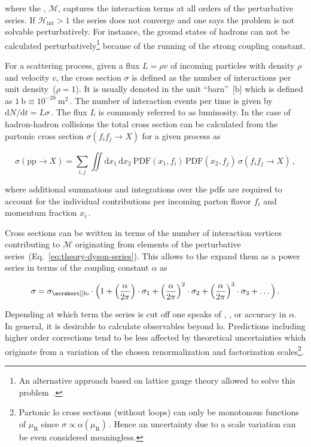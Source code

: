 where the , $\mathcal{M}$, captures the interaction terms at all orders of the perturbative series.  If $\mathcal{H}_\mathrm{int}>1$ the series does not converge and one says the problem is not solvable perturbatively. For instance, the ground states of hadrons can not be calculated perturbatively\footnote{An alternative approach based on lattice gauge theory allowed to solve this problem~\cite{Durr:2008zz}.} because of the running of the strong coupling constant.

For a scattering process, given a flux $L=\rho v$ of incoming particles with density $\rho$ and velocity $v$, the cross section $\sigma$ is defined as the number of interactions per unit density~($\rho=1$). It is usually denoted in the unit ``barn''~[$\mathrm{b}$] which is defined as $1~\mathrm{b}\equiv 10^{-28}~\mathrm{m}^{2}\,$.  The number of interaction events per time is given by $\mathrm{d}N/\mathrm{d}t=L\sigma\,$. The flux $L$ is commonly referred to as luminosity. In the case of hadron-hadron collisions the total cross section can be calculated from the partonic cross section $\sigma(f_{i}f_{j}\to X)$ for a given process  as

\begin{equation}
\sigma(\mathrm{pp}\to X)=\sum_{i,j}\iint\mathrm{d}x_{1}\,\mathrm{d}x_{2}~\mathrm{PDF}(x_{1},f_{i})\,\mathrm{PDF}(x_{2},f_{j})\,\sigma(f_{i}f_{j}\to X)\,,
\end{equation}

where additional summations and integrations over the \glspl{pdf} are required to account for the individual contributions per incoming parton flavor $f_{i}$ and momentum fraction $x_{i}\,$.

Cross sections can be written in terms of the number of interaction vertices contributing to $\mathcal{M}$ originating from elements of the perturbative series~(Eq.~\ref{eq:theory-dyson-series}). This allows to the expand them as a power series in terms of the coupling constant $\alpha$ as

\begin{equation}
\sigma=\sigma_\mathrm{\gls{lo}}\cdot\Big(1+\Big(\frac{\alpha}{2\pi}\Big)\cdot\sigma_\mathrm{1}+\Big(\frac{\alpha}{2\pi}\Big)^2\cdot\sigma_{2}+\Big(\frac{\alpha}{2\pi}\Big)^{3}\cdot\sigma_{3}+\ldots\Big)\,.
\end{equation}

Depending at which term the series is cut off one speaks of , , or  accuracy in $\alpha$. In general, it is desirable to calculate observables beyond \gls{lo}. Predictions including higher order corrections tend to be less affected by theoretical uncertainties which originate from a variation of the chosen renormalization and factorization scales\footnote{Partonic \gls{lo} cross sections (without loops) can only be monotonous functions of $\mu_\mathrm{R}$ since $\sigma\propto\alpha(\mu_\mathrm{R})$\,. Hence an uncertainty due to a scale variation can be even considered meaningless.}.

